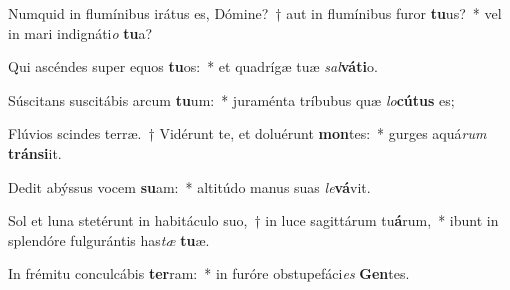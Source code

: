 \item Numquid in flumínibus irátus es, Dómine?~† aut in flumínibus furor \textbf{tu}us?~* vel in mari indignáti\textit{o} \textbf{tu}a?
\item Qui ascéndes super equos \textbf{tu}os:~* et quadrígæ tuæ \textit{sal}\textbf{vá}\textbf{ti}o.
\item Súscitans suscitábis arcum \textbf{tu}um:~* juraménta tríbubus quæ \textit{lo}\textbf{cú}\textbf{tus} es;
\item Flúvios scindes terræ.~† Vidérunt te, et doluérunt \textbf{mon}tes:~* gurges aquá\textit{rum} \textbf{tráns}\textbf{i}it.
\item Dedit abýssus vocem \textbf{su}am:~* altitúdo manus suas \textit{le}\textbf{vá}vit.
\item Sol et luna stetérunt in habitáculo suo,~† in luce sagittárum tu\textbf{á}rum,~* ibunt in splendóre fulgurántis has\textit{tæ} \textbf{tu}æ.
\item In frémitu conculcábis \textbf{ter}ram:~* in furóre obstupefáci\textit{es} \textbf{Gen}tes.
